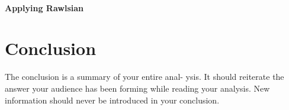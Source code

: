 \documentclass[11pt]{article}
\begin{document}
\begin{multicols}{2}

\paragraph{Applying Rawlsian}


\section{Conclusion} The conclusion is a summary of your entire anal- ysis. It
should reiterate the answer your audience has been forming while reading your
analysis. New information should never be introduced in your conclusion.
\cite{texTemp}

\end{multicols} \newpage

\nocite{*}




\end{document}
